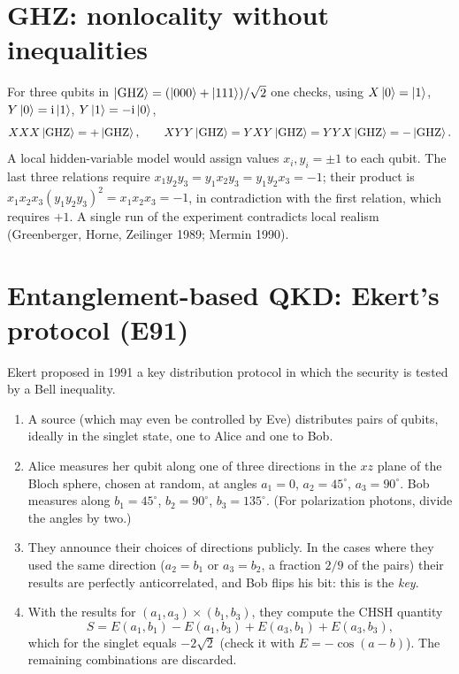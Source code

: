 \section{GHZ: nonlocality without inequalities\starred}
For three qubits in $\left|\rm GHZ\right\rangle=(\left|000\right\rangle+\left|111\right\rangle)/\sqrt2$ one checks, using $X\left|0\right\rangle=\left|1\right\rangle$, $Y\left|0\right\rangle=\mathrm i\left|1\right\rangle$, $Y\left|1\right\rangle=-\mathrm i\left|0\right\rangle$,
\begin{equation}
  XXX\left|\rm GHZ\right\rangle=+\left|\rm GHZ\right\rangle,\qquad XYY\left|\rm GHZ\right\rangle=YXY\left|\rm GHZ\right\rangle=YYX\left|\rm GHZ\right\rangle=-\left|\rm GHZ\right\rangle.
\end{equation}
A local hidden-variable model would assign values $x_i,y_i=\pm1$ to each qubit. The last three relations require $x_1y_2y_3=y_1x_2y_3=y_1y_2x_3=-1$; their product is
$x_1x_2x_3(y_1y_2y_3)^2=x_1x_2x_3=-1$, in contradiction with the first relation, which requires $+1$. A single run of the experiment contradicts local realism
(Greenberger, Horne, Zeilinger 1989; Mermin 1990).

\section{Entanglement-based QKD: Ekert's protocol (E91)}\label{sec:e91}
Ekert \cite{Ekert1991} proposed in 1991 a key distribution protocol in which the security is tested by a Bell inequality.
\begin{enumerate}
  \item A source (which may even be controlled by Eve) distributes pairs of qubits, ideally in the singlet state, one to Alice and one to Bob.
  \item Alice measures her qubit along one of three directions in the $xz$ plane of the Bloch sphere, chosen at random, at angles $a_1=0$, $a_2=45^\circ$, $a_3=90^\circ$.
  Bob measures along $b_1=45^\circ$, $b_2=90^\circ$, $b_3=135^\circ$. (For polarization photons, divide the angles by two.)
  \item They announce their choices of directions publicly. In the cases where they used the same direction ($a_2=b_1$ or $a_3=b_2$, a fraction $2/9$ of the pairs)
  their results are perfectly anticorrelated, and Bob flips his bit: this is the \emph{key}.
  \item With the results for $(a_1,a_3)\times(b_1,b_3)$, they compute the CHSH quantity
  \begin{equation}
    S=E(a_1,b_1)-E(a_1,b_3)+E(a_3,b_1)+E(a_3,b_3),
  \end{equation}
  which for the singlet equals $-2\sqrt2$ (check it with $E=-\cos(a-b)$). The remaining combinations are discarded.
\end{enumerate}
